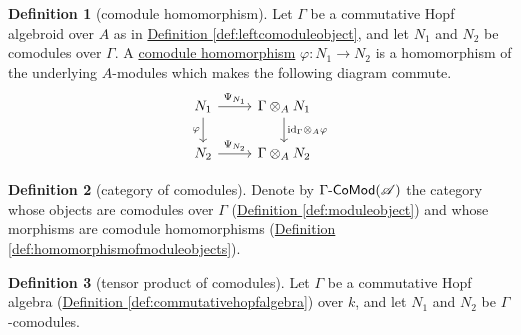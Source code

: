 \documentclass[a4paper,10pt]{scrreprt}
\newcommand{\defn}[1]{\ul{#1}}
\def\mhyp{{\hbox{-}}}
\theoremstyle{definition}
\newtheorem{definition}{Definition}[section]
\theoremstyle{plain}
\theoremstyle{remark}
\begin{document}
\begin{definition}[comodule homomorphism]
  \label{def:comodulehomomorphism}
  Let $\Gamma$ be a commutative Hopf algebroid over $A$ as in \hyperref[def:leftcomoduleobject]{Definition \ref*{def:leftcomoduleobject}}, and let $N_{1}$ and $N_{2}$ be comodules over $\Gamma$. A \defn{comodule homomorphism} $\varphi\colon N_{1} \to N_{2}$ is a homomorphism of the underlying $A$-modules which makes the following diagram commute.
  \begin{equation*}
    \begin{tikzcd}
      N_{1} 
      \arrow[r, "\Psi_{N_{1}}"]
      \arrow[d, swap, "\varphi"]
      & \Gamma \otimes_{A} N_{1}
      \arrow[d, "\mathrm{id}_{\Gamma}\otimes_{A} \varphi"]
      \\
      N_{2} 
      \arrow[r, "\Psi_{N_{2}}"]
      & \Gamma \otimes_{A} N_{2}
    \end{tikzcd}
  \end{equation*}
\end{definition}

\begin{definition}[category of comodules]
  \label{def:categoryofcomodules}
  Denote by $\Gamma\mhyp\mathsf{CoMod}(\mathscr{A})$ the category whose objects are comodules over $\Gamma$ (\hyperref[def:moduleobject]{Definition \ref*{def:moduleobject}}) and whose morphisms are comodule homomorphisms (\hyperref[def:homomorphismofmoduleobjects]{Definition \ref*{def:homomorphismofmoduleobjects}}).
\end{definition}

\begin{definition}[tensor product of comodules]
  \label{def:tensorproductofcomodules}
  Let $\Gamma$ be a commutative Hopf algebra (\hyperref[def:commutativehopfalgebra]{Definition \ref*{def:commutativehopfalgebra}}) over $k$, and let $N_{1}$ and $N_{2}$ be $\Gamma$-comodules.
\end{definition}
\end{document}

